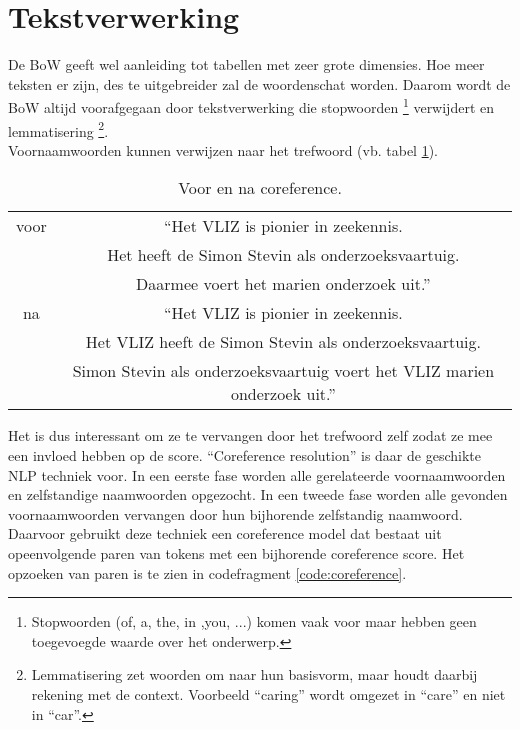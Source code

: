 \section{Tekstverwerking}
De BoW geeft wel aanleiding tot tabellen met zeer grote dimensies. Hoe meer teksten er zijn, des te uitgebreider zal de woordenschat worden. Daarom wordt de BoW altijd voorafgegaan door tekstverwerking die stopwoorden \footnote{Stopwoorden (of, a, the, in ,you, ...) komen vaak voor maar hebben geen toegevoegde waarde over het onderwerp.} verwijdert en lemmatisering \footnote{Lemmatisering zet woorden om naar hun basisvorm, maar houdt daarbij rekening met de context. Voorbeeld ``caring'' wordt omgezet in ``care'' en niet in ``car''.}.\\
Voornaamwoorden kunnen verwijzen naar het trefwoord 
(vb. tabel \ref{table:nlp}).
\begin{table}[h!]
    \centering
    \begin{tabular}{|c|c|} 
        \hline
        voor&``Het VLIZ is pionier in zeekennis.\\&Het heeft de Simon Stevin als onderzoeksvaartuig.\\&Daarmee voert het marien onderzoek uit.''\\
        \hline
        na&``Het VLIZ is pionier in zeekennis.\\&Het VLIZ heeft de Simon Stevin als onderzoeksvaartuig.\\&Simon Stevin als onderzoeksvaartuig voert het VLIZ marien onderzoek uit.''\\
        \hline
    \end{tabular}
    \caption{Voor en na coreference.}
    \label{table:nlp}
\end{table}
Het is dus interessant om ze te vervangen door het trefwoord zelf zodat ze mee een invloed hebben op de score. ``Coreference resolution'' is daar de geschikte NLP techniek voor. In een eerste fase worden alle gerelateerde voornaamwoorden en zelfstandige naamwoorden opgezocht. In een tweede fase worden alle gevonden voornaamwoorden vervangen door hun bijhorende zelfstandig naamwoord. Daarvoor gebruikt deze techniek een coreference model dat bestaat uit opeenvolgende paren van tokens met een bijhorende coreference score.
Het opzoeken van paren is te zien in codefragment \ref{code:coreference}.
